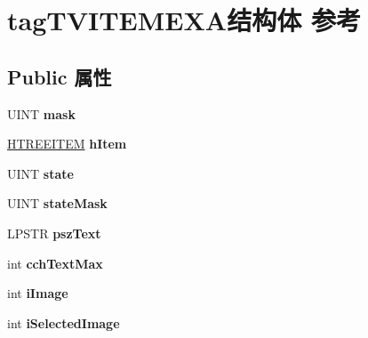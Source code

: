 \hypertarget{structtag_t_v_i_t_e_m_e_x_a}{}\section{tag\+T\+V\+I\+T\+E\+M\+E\+X\+A结构体 参考}
\label{structtag_t_v_i_t_e_m_e_x_a}
\subsection*{Public 属性}
\begin{DoxyCompactItemize}
\item 
\mbox{\label{structtag_t_v_i_t_e_m_e_x_a_a3441acc7c1137584c079d6a5c5539080}} 
U\+I\+NT {\bfseries mask}
\item 
\mbox{\label{structtag_t_v_i_t_e_m_e_x_a_ad328027182398d778798aa84620d1160}} 
\hyperlink{struct___t_r_e_e_i_t_e_m}{H\+T\+R\+E\+E\+I\+T\+EM} {\bfseries h\+Item}
\item 
\mbox{\label{structtag_t_v_i_t_e_m_e_x_a_a69196e6b979a38999647a9026f461d35}} 
U\+I\+NT {\bfseries state}
\item 
\mbox{\label{structtag_t_v_i_t_e_m_e_x_a_af4764468931f31f2f11d45e683a14314}} 
U\+I\+NT {\bfseries state\+Mask}
\item 
\mbox{\label{structtag_t_v_i_t_e_m_e_x_a_a7818af5862fc61e5bd90856e1aaf29bc}} 
L\+P\+S\+TR {\bfseries psz\+Text}
\item 
\mbox{\label{structtag_t_v_i_t_e_m_e_x_a_a191d295d7e37ec561d2c0d9122d302ff}} 
int {\bfseries cch\+Text\+Max}
\item 
\mbox{\label{structtag_t_v_i_t_e_m_e_x_a_a17a74cc4303059b1aa1b960a03580a34}} 
int {\bfseries i\+Image}
\item 
\mbox{\label{structtag_t_v_i_t_e_m_e_x_a_aaa473fd22f083410c9df9873458c3fcb}} 
int {\bfseries i\+Selected\+Image}
\item 
\mbox{\label{structtag_t_v_i_t_e_m_e_x_a_a4d698f2a8e7ea2f3c4f3b23ca64b9981}} 

\end{DoxyCompactItemize}

